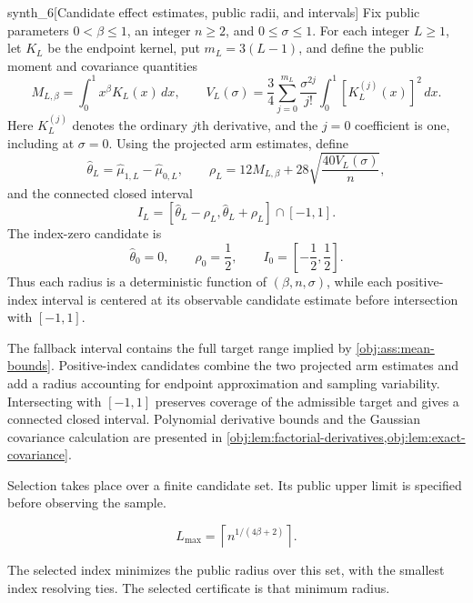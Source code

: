 \begin{definitionv}{synth_6}[Candidate effect estimates, public radii, and intervals]
Fix public parameters \(0<\beta\le1\), an integer \(n\ge2\), and \(0\le\sigma\le1\). For each integer \(L\ge1\), let \(K_L\) be the endpoint kernel, put \(m_L=3(L-1)\), and define the public moment and covariance quantities
\[
M_{L,\beta}=\int_0^1x^\beta K_L(x)\,dx,
\qquad
V_L(\sigma)=\frac34\sum_{j=0}^{m_L}
\frac{\sigma^{2j}}{j!}
\int_0^1[K_L^{(j)}(x)]^2\,dx.
\]
Here \(K_L^{(j)}\) denotes the ordinary \(j\)th derivative, and the \(j=0\) coefficient is one, including at \(\sigma=0\). Using the projected arm estimates, define
\[
\widehat\theta_L=\widehat\mu_{1,L}-\widehat\mu_{0,L},
\qquad
\rho_L=12M_{L,\beta}
+28\sqrt{\frac{40V_L(\sigma)}{n}},
\]
and the connected closed interval
\[
I_L=
[\widehat\theta_L-\rho_L,\widehat\theta_L+\rho_L]
\cap[-1,1].
\]
The index-zero candidate is
\[
\widehat\theta_0=0,\qquad
\rho_0=\frac12,\qquad
I_0=\left[-\frac12,\frac12\right].
\]
Thus each radius is a deterministic function of \((\beta,n,\sigma)\), while each positive-index interval is centered at its observable candidate estimate before intersection with \([-1,1]\).
\end{definitionv}

The fallback interval contains the full target range implied by \cref{obj:ass:mean-bounds}. Positive-index candidates combine the two projected arm estimates and add a radius accounting for endpoint approximation and sampling variability. Intersecting with \([-1,1]\) preserves coverage of the admissible target and gives a connected closed interval. Polynomial derivative bounds and the Gaussian covariance calculation are presented in \cref{obj:lem:factorial-derivatives,obj:lem:exact-covariance}.

Selection takes place over a finite candidate set. Its public upper limit  is specified before observing the sample.

\[
L_{\max}=\left\lceil n^{1/(4\beta+2)}\right\rceil.
\]

The selected index  minimizes the public radius over this set, with the smallest index resolving ties. The selected certificate  is that minimum radius.


